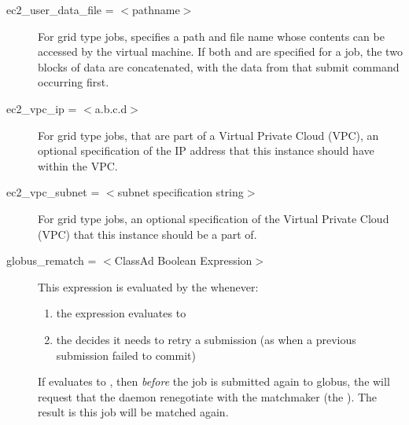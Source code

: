 \begin{description}

\label{condor-submit-ec2-user-data-file}
\item[ec2\_user\_data\_file = $<$pathname$>$]
For grid type  jobs, 
specifies a path and file name whose contents can be 
accessed by the virtual machine.
If both  and 
 are specified for a job,
the two blocks of data are concatenated, 
with the data from that  submit command 
occurring first.


\label{condor-submit-ec2-vpc-ip}
\item[ec2\_vpc\_ip = $<$a.b.c.d$>$]
For grid type  jobs, 
that are part of a Virtual Private Cloud (VPC),
an optional specification of the IP address that this instance should have 
within the VPC.


\label{condor-submit-ec2-vpc-subnet}
\item[ec2\_vpc\_subnet = $<$subnet specification string$>$]
For grid type  jobs, 
an optional specification of the Virtual Private Cloud (VPC) that
this instance should be a part of.



\label{condor-submit-globus-rematch}
\item[globus\_rematch = $<$ClassAd Boolean Expression$>$]
\label{condor-submit-globus-rematch}
This expression is evaluated by the  whenever:
\begin{enumerate}
\item
   the  expression evaluates to 
\item
   the  decides it needs to retry a submission
   (as when a previous submission failed to commit)
\end{enumerate}
If  evaluates to ,
then \emph{before} the job is submitted again to globus,
the  will request that the 
daemon renegotiate
with the matchmaker (the ).
The result is this job will be matched again.


\end{description}
